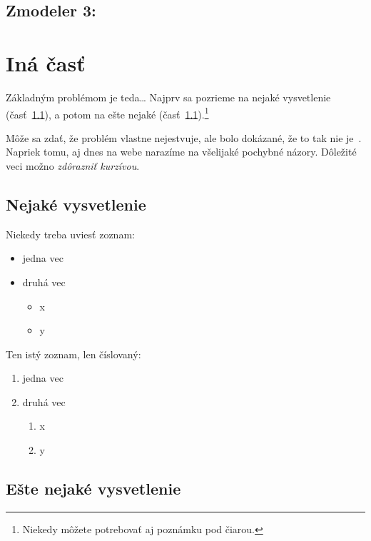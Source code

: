\documentclass[10pt,twoside,slovak,a4paper]{article}
\begin{document}
\subsection{Zmodeler 3:} \label{zakladneinformacie:zmodeler3}



\section{Iná časť} \label{ina}

Základným problémom je teda\ldots{} Najprv sa pozrieme na nejaké vysvetlenie (časť~\ref{ina:nejake}), a potom na ešte nejaké (časť~\ref{ina:nejake}).\footnote{Niekedy môžete potrebovať aj poznámku pod čiarou.}

Môže sa zdať, že problém vlastne nejestvuje\cite{Coplien:MPD}, ale bolo dokázané, že to tak nie je~\cite{Czarnecki:Staged, Czarnecki:Progress}. Napriek tomu, aj dnes na webe narazíme na všelijaké pochybné názory\cite{PLP-Framework}. Dôležité veci možno \emph{zdôrazniť kurzívou}.


\subsection{Nejaké vysvetlenie} \label{ina:nejake}

Niekedy treba uviesť zoznam:

\begin{itemize}
\item jedna vec
\item druhá vec
	\begin{itemize}
	\item x
	\item y
	\end{itemize}
\end{itemize}

Ten istý zoznam, len číslovaný:

\begin{enumerate}
\item jedna vec
\item druhá vec
	\begin{enumerate}
	\item x
	\item y
	\end{enumerate}
\end{enumerate}


\subsection{Ešte nejaké vysvetlenie} \label{ina:este}
\end{document}
